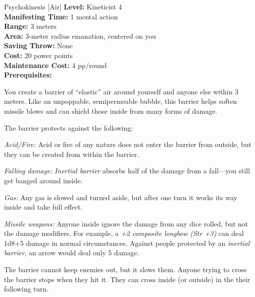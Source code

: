 {Psychokinesis [Air]}
{
	\textbf{Level:}
	Kineticist 4\\
	\textbf{Manifesting Time:}
	1 mental action\\
	\textbf{Range:}
	3 meters\\
	\textbf{Area:}
	3-meter radius emanation, centered on you\\
	\textbf{Saving Throw:}
	None\\
	\textbf{Cost:}
	20 power points\\
	\textbf{Maintenance Cost:}
	4 pp/round\\
	\textbf{Prerequisites:}
	\\
}
{
	You create a barrier of ``elastic'' air around yourself and anyone else within 3 meters. Like an unpoppable, semipermeable bubble, this barrier helps soften missile blows and can shield those inside from many forms of damage.

	The barrier protects against the following:
	\begin{itemize*}
		\item \textit{Acid/Fire:} Acid or fire of any nature does not enter the barrier from outside, but they can be created from within the barrier.
		\item \textit{Falling damage:} \emph{Inertial barrier} absorbs half of the damage from a fall---you still get banged around inside.
		\item \textit{Gas:} Any gas is slowed and turned aside, but after one turn it works its way inside and take full effect.
		\item \textit{Missile weapons:} Anyone inside ignore the damage from any dice rolled, but not the damage modifiers. For example, a \emph{+2 composite longbow (Str +3)} can deal 1d8+5 damage in normal circumstances. Against people protected by an \emph{inertial barrier}, an arrow would deal only 5 damage.
	\end{itemize*}

	The barrier cannot keep enemies out, but it slows them. Anyone trying to cross the barrier stops when they hit it. They can cross inside (or outside) in the their following turn.
}